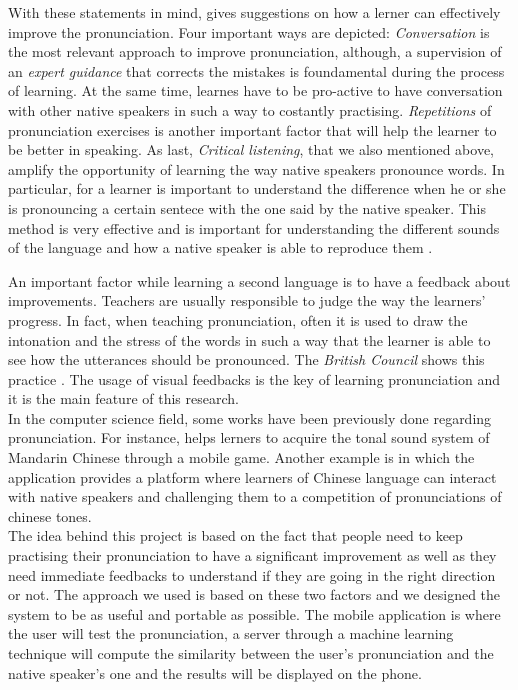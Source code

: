 \noindent With these statements in mind, \cite{gilakjani2011pronunciation} gives suggestions on how a lerner can effectively improve the pronunciation. Four important ways are depicted: \textit{Conversation} is the most relevant approach to improve pronunciation, although, a supervision of an \textit{expert guidance} that corrects the mistakes is foundamental during the process of learning. At the same time, learnes have to be pro-active to have conversation with other native speakers in such a way to costantly practising. \textit{Repetitions} of pronunciation exercises is another important factor that will help the learner to be better in speaking. As last, \textit{Critical listening}, that we also mentioned above, amplify the opportunity of learning the way native speakers pronounce words. In particular, for a learner is important to understand the difference when he or she is pronouncing a certain sentece with the one said by the native speaker. This method is very effective and is important for understanding the different sounds of the language and how a native speaker is able to reproduce them \cite{rost2014listening}.

\noindent An important factor while learning a second language is to have a feedback about improvements. Teachers are usually responsible to judge the way the learners' progress. In fact, when teaching pronunciation, often it is used to draw the intonation and the stress of the words in such a way that the learner is able to see how the utterances should be pronounced. The \textit{British Council} shows this practice \cite{bbc_stress}. The usage of visual feedbacks is the key of learning pronunciation and it is the main feature of this research. \\

\noindent In the computer science field, some works have been previously done regarding pronunciation. For instance, \cite{edge2012tip} helps lerners to acquire the tonal sound system of Mandarin Chinese through a mobile game. Another example is \cite{head2014tonewars} in which the application provides a platform where learners of Chinese language can interact with native speakers and challenging them to a competition of pronunciations of chinese tones. \\

\noindent The idea behind this project is based on the fact that people need to keep practising their pronunciation to have a significant improvement as well as they need immediate feedbacks to understand if they are going in the right direction or not. The approach we used is based on these two factors and we designed the system to be as useful and portable as possible. The mobile application is where the user will test the pronunciation, a server through a machine learning technique will compute the similarity between the user's pronunciation and the native speaker's one and the results will be displayed on the phone. \\

